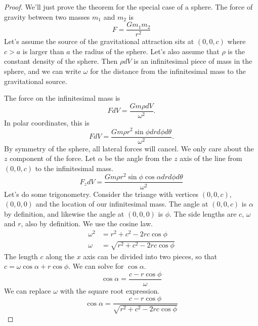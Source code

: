 \documentclass[fleqn,letterpaper]{report}
\begin{document}
\begin{proof}
We'll just prove the theorem for the special case of a sphere. 
The force of gravity between two masses $m_1$ and $m_2$ is
\begin{equation*}
F = \frac{Gm_1m_2}{r^2}
\end{equation*} 
Let's assume the source of the gravitational attraction sits
at $(0,0,c)$ where $c >a$ is larger than $a$ the radius of the
sphere. Let's also assume that $\rho$ is the constant density
of the sphere. Then $\rho dV$ is an infinitesimal piece of
mass in the sphere, and we can write $\omega$ for the distance
from the infinitesimal mass to the gravitational source.

The force on the infinitesimal mass is 
\begin{equation*}
F dV = \frac{Gm\rho dV}{\omega^2}.
\end{equation*}
In polar coordinates, this is 
\begin{equation*}
F dV = \frac{Gm\rho r^2 \sin \phi dr d\phi d\theta}{\omega^2}. 
\end{equation*}
By symmetry of the sphere, all lateral forces will cancel. We
only care about the $z$ component of the force. Let $\alpha$
be the angle from the $z$ axis of the line from $(0,0,c)$ to
the infinitesimal mass. 
\begin{equation*}
F_z dV = \frac{Gm\rho r^2 \sin \phi \cos \alpha dr d\phi
d\theta}{\omega^2} 
\end{equation*}
Let's do some trigonometry. Consider the triange with
vertices $(0,0,c)$, $(0,0,0)$ and the location of our
infinitesimal mass. The angle at $(0,0,c)$ is $\alpha$ by
definition, and likewise the angle at $(0,0,0)$ is $\phi$.
The side lengths are $c$, $\omega$ and $r$, also by
definition. We use the cosine law.
\begin{align*}
\omega^2 & = r^2 + c^2 - 2rc \cos \phi \\
\omega & = \sqrt{r^2 + c^2 - 2rc \cos \phi}
\end{align*}
The length $c$ along the $x$ axis can be divided into two
pieces, so that $c = \omega \cos \alpha + r \cos \phi$. We
can solve for $\cos \alpha$.
\begin{equation*}
\cos \alpha = \frac{ c - r \cos \phi}{\omega} 
\end{equation*}
We can replace $\omega$ with the square root expression.
\begin{equation*}
\cos \alpha = \frac{ c - r \cos \phi}{\sqrt{r^2 + c^2 - 2rc
\cos \phi}}
\end{equation*}

\end{proof}
\end{document}
